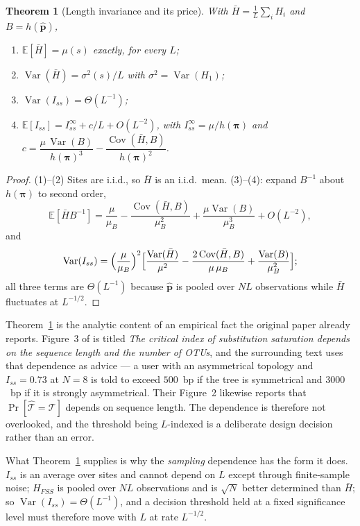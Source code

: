 \documentclass[11pt]{article}
\newcommand{\Iss}{I_{ss}}
\newcommand{\Hbar}{\bar H}
\newcommand{\HFSS}{H_{FSS}}
\newcommand{\bpi}{\boldsymbol{\pi}}
\newcommand{\E}{\mathbb{E}}
\newcommand{\Var}{\operatorname{Var}}
\newcommand{\Cov}{\operatorname{Cov}}
\newtheorem{theorem}{Theorem}
\theoremstyle{definition}
\theoremstyle{remark}
\begin{document}
\begin{theorem}[Length invariance and its price]
\label{thm:length}
With $\Hbar=\frac1L\sum_iH_i$ and $B=h(\hat{\mathbf p})$,
\begin{enumerate}
\item $\E[\Hbar]=\mu(s)$ exactly, for every $L$;
\item $\Var(\Hbar)=\sigma^2(s)/L$ with $\sigma^2=\Var(H_1)$;
\item $\Var(\Iss)=\Theta(L^{-1})$;
\item $\E[\Iss]=\Iss^\infty+c/L+O(L^{-2})$, with
      $\Iss^\infty=\mu/h(\bpi)$ and
      $c=\dfrac{\mu\,\Var(B)}{h(\bpi)^3}-\dfrac{\Cov(\Hbar,B)}{h(\bpi)^2}$.
\end{enumerate}
\end{theorem}

\begin{proof}
(1)--(2) Sites are i.i.d., so $\Hbar$ is an i.i.d.\ mean. (3)--(4): expand
$B^{-1}$ about $h(\bpi)$ to second order,
\[
  \E[\Hbar B^{-1}]=\frac{\mu}{\mu_B}
  -\frac{\Cov(\Hbar,B)}{\mu_B^2}
  +\frac{\mu\Var(B)}{\mu_B^3}+O(L^{-2}),
\]
and
\[
  \Var(\Iss)=\Bigl(\frac{\mu}{\mu_B}\Bigr)^2
  \Bigl[\frac{\Var(\Hbar)}{\mu^2}
  -\frac{2\Cov(\Hbar,B)}{\mu\,\mu_B}
  +\frac{\Var(B)}{\mu_B^2}\Bigr];
\]
all three terms are $\Theta(L^{-1})$ because $\hat{\mathbf p}$ is pooled over
$NL$ observations while $\Hbar$ fluctuates at $L^{-1/2}$.
\end{proof}

Theorem~\ref{thm:length} is the analytic content of an empirical fact the
original paper already reports. Figure~3 of \citet{xia2003iss} is titled
\emph{The critical index of substitution saturation depends on the sequence
length and the number of OTUs}, and the surrounding text uses that dependence
as advice --- a user with an asymmetrical topology and $\Iss=0.73$ at $N=8$ is
told to exceed $500$~bp if the tree is symmetrical and $3000$~bp if it is
strongly asymmetrical. Their Figure~2 likewise reports that
$\Pr[\hat{\mathcal T}=\mathcal T]$ depends on sequence length. The dependence
is therefore not overlooked, and the threshold being $L$-indexed is a
deliberate design decision rather than an error.

What Theorem~\ref{thm:length} supplies is why the \emph{sampling} dependence
has the form it does. $\Iss$ is an average over sites and cannot depend on
$L$ except through finite-sample noise; $\HFSS$ is pooled over $NL$
observations and is $\sqrt N$ better determined than $\Hbar$; so
$\Var(\Iss)=\Theta(L^{-1})$, and a decision threshold held at a fixed
significance level must therefore move with $L$ at rate $L^{-1/2}$.
\end{document}
